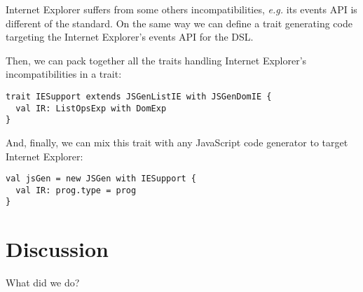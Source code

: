 \documentclass[american,english,runningheads]{llncs}
\newcommand{\eg}{\emph{e.g.}}
\begin{document}
Internet Explorer suffers from some others incompatibilities, \eg{} its events API is different of the standard. On the same way we can define a  trait generating code targeting the Internet Explorer’s events API for the  DSL.

Then, we can pack together all the traits handling Internet Explorer’s incompatibilities in a  trait:

\begin{lstlisting}
trait IESupport extends JSGenListIE with JSGenDomIE {
  val IR: ListOpsExp with DomExp
}
\end{lstlisting}

And, finally, we can mix this  trait with any JavaScript code generator to target Internet Explorer:

\begin{lstlisting}
val jsGen = new JSGen with IESupport {
  val IR: prog.type = prog
}
\end{lstlisting}

\section{Discussion}
\label{discussion}

What did we do?



\end{document}
